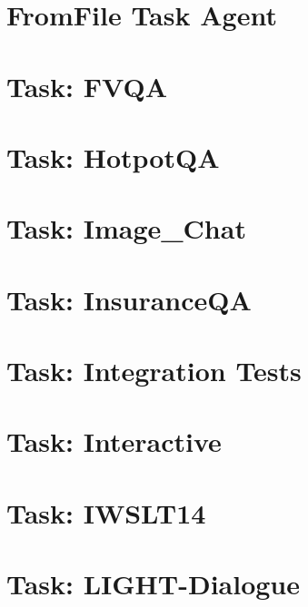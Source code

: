 \documentclass[twoside]{book}
\newcommand{\+}{\discretionary{\mbox{\scriptsize$\hookleftarrow$}}{}{}}
\begin{document}
\chapter{From\+File Task Agent}
\label{md_parlai_tasks_fromfile_README}

\chapter{Task\+: F\+V\+QA}
\label{md_parlai_tasks_fvqa_README}

\chapter{Task\+: Hotpot\+QA}
\label{md_parlai_tasks_hotpotqa_README}

\chapter{Task\+: Image\+\_\+\+Chat}
\label{md_parlai_tasks_image_chat_README}

\chapter{Task\+: Insurance\+QA}
\label{md_parlai_tasks_insuranceqa_README}

\chapter{Task\+: Integration Tests}
\label{md_parlai_tasks_integration_tests_README}

\chapter{Task\+: Interactive}
\label{md_parlai_tasks_interactive_README}

\chapter{Task\+: I\+W\+S\+L\+T14}
\label{md_parlai_tasks_iwslt14_README}

\chapter{Task\+: L\+I\+G\+H\+T-\/\+Dialogue}
\label{md_parlai_tasks_light_dialog_README}

\end{document}
